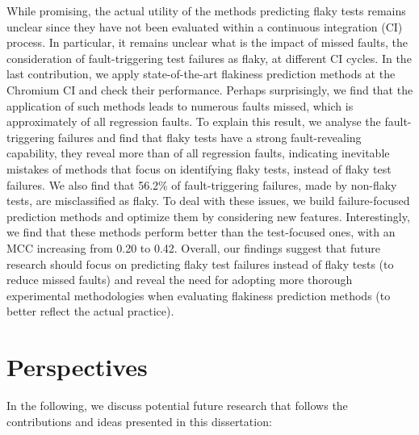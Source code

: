  While promising, the actual utility of the methods predicting flaky tests remains unclear since they have not been evaluated within a continuous integration (CI) process. In particular, it remains unclear what is the impact of missed faults, \ie the consideration of fault-triggering test failures as flaky, at different CI cycles. In the last contribution, we apply state-of-the-art flakiness prediction methods at the Chromium CI and check their performance. Perhaps surprisingly, we find that the application of such methods leads to numerous faults missed, which is approximately  of all regression faults. To explain this result, we analyse the fault-triggering failures and find that flaky tests have a strong fault-revealing capability, \ie they reveal more than  of all regression faults, indicating inevitable mistakes of methods that focus on identifying flaky tests, instead of flaky test failures. We also find that 56.2\% of fault-triggering failures, made by non-flaky tests, are misclassified as flaky. To deal with these issues, we build failure-focused prediction methods and optimize them by considering new features. Interestingly, we find that these methods perform better than the test-focused ones, with an MCC increasing from 0.20 to 0.42. Overall, our findings suggest that future research should focus on predicting flaky test failures instead of flaky tests (to reduce missed faults) and reveal the need for adopting more thorough experimental methodologies when evaluating flakiness prediction methods (to better reflect the actual practice).


\section{Perspectives}

In the following, we discuss potential future research that follows the contributions and ideas presented in this dissertation:

